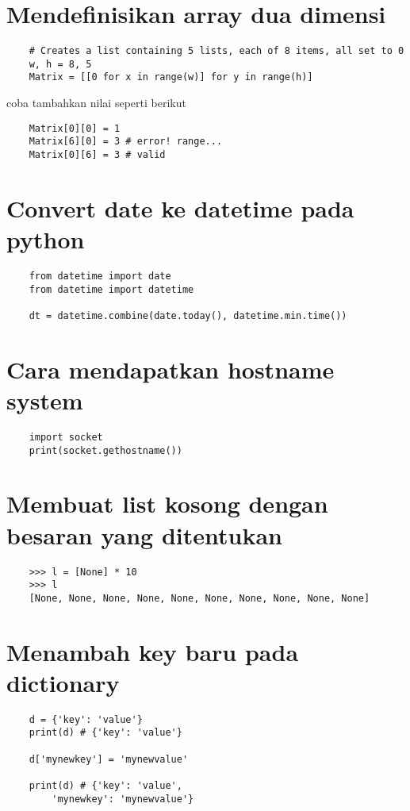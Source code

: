 \documentclass{article}
\begin{document}
\section {Mendefinisikan array dua dimensi}
\begin{lstlisting}
	# Creates a list containing 5 lists, each of 8 items, all set to 0
	w, h = 8, 5
	Matrix = [[0 for x in range(w)] for y in range(h)] 
\end{lstlisting}
coba tambahkan nilai seperti berikut
\begin{lstlisting}
	Matrix[0][0] = 1
	Matrix[6][0] = 3 # error! range... 
	Matrix[0][6] = 3 # valid
\end{lstlisting}

\section {Convert date ke datetime pada python}
\begin{lstlisting}
	from datetime import date
	from datetime import datetime
	
	dt = datetime.combine(date.today(), datetime.min.time())
\end{lstlisting}

\section {Cara mendapatkan hostname system}
\begin{lstlisting}
	import socket
	print(socket.gethostname())
\end{lstlisting}

\section {Membuat list kosong dengan besaran yang ditentukan}
\begin{lstlisting}
	>>> l = [None] * 10
	>>> l
	[None, None, None, None, None, None, None, None, None, None]
\end{lstlisting}

\section{Menambah key baru pada dictionary}
\begin{lstlisting}
	d = {'key': 'value'}
	print(d) # {'key': 'value'}
	
	d['mynewkey'] = 'mynewvalue'
	
	print(d) # {'key': 'value',
		'mynewkey': 'mynewvalue'}
\end{lstlisting}
\end{document}
